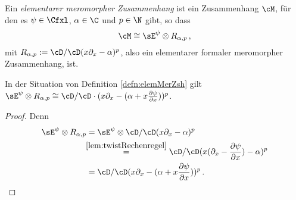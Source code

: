 \begin{defn} \label{defn:elemMerZsh}
Ein \emph{elementarer meromorpher Zusammenhang} ist ein Zusammenhang $\cM$, für
den es $\psi \in \Cfxl$, $\alpha\in\C$ und $p\in \N$ gibt, so dass
\[
\cM\cong \sE^{\psi}\otimes R_{\alpha,p}\,,
\]
mit $R_{\alpha,p}:=\cD/\cD(x\partial_x-\alpha)^p$, also ein elementarer
formaler meromorpher Zusammenhang, ist.
\end{defn}

\begin{lem} In der Situation von Definition \ref{defn:elemMerZsh} gilt
$\sE^{\psi}\otimes R_{\alpha,p}\cong
\cD/\cD\cdot(x\partial_x-(\alpha+x\frac{\partial \psi}{\partial x}))^p$.
\end{lem}
\begin{proof} Denn
\begin{align*}
\sE^{\psi}\otimes R_{\alpha,p}&=\sE^{\psi}\otimes\cD/\cD(x\partial_x-\alpha)^p
\\&\!\!\overset{\ref{lem:twistRechenregel}}{=}
  \cD/\cD(x(\partial_x-\frac{\partial \psi}{\partial x})-\alpha)^p
\\&=\cD/\cD(x\partial_x-(\alpha+x\frac{\partial \psi}{\partial x}))^p \,.
\end{align*}
\end{proof}

